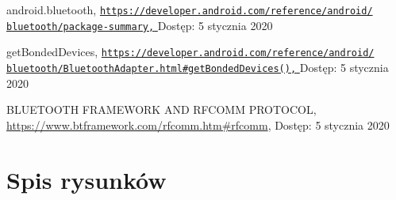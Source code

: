 \documentclass[a4paper,12pt, twoside]{article}
\begin{document}
\begin{thebibliography}{}
    		android.bluetooth,
    		\newline\href{https://developer.android.com/reference/android/bluetooth/}
    		 {\nolinkurl{https://developer.android.com/reference/android/}
                 \\
                  \nolinkurl{bluetooth/package-summary,}
                 }
    		\newline Dostęp: 5 stycznia 2020
    		
    		getBondedDevices,
    		\newline\href{https://developer.android.com/reference/android/bluetooth/BluetoothAdapter.html\#getBondedDevices()}
    		 {\nolinkurl{https://developer.android.com/reference/android/}
                 \\
                  \nolinkurl{bluetooth/BluetoothAdapter.html\#getBondedDevices(),}
                 }
    		\newline Dostęp: 5 stycznia 2020
    		
    		BLUETOOTH FRAMEWORK AND RFCOMM PROTOCOL,
    		\newline\url{https://www.btframework.com/rfcomm.htm#rfcomm}, 
    		\newline Dostęp: 5 stycznia 2020
    		
    	\end{thebibliography}
    	\endgroup
    	
    	\newpage
    	\section{Spis rysunków}
    	\begingroup
    	\renewcommand{\section}[2]{}%
    	\listoffigures
    	\endgroup
    	
    	\newpage
    	\section{Spis algorytmów}
    	\begingroup
    	\renewcommand{\section}[2]{}%
    	\lstlistoflistings
    	\renewcommand{\section}[2]{}%
    	\endgroup
    	
    
\end{document}
